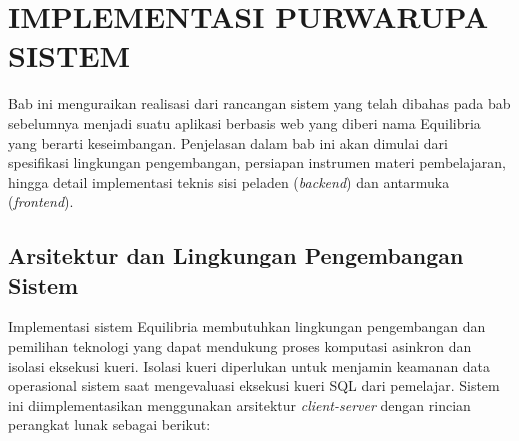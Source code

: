 \cleardoublepage
\chapter{IMPLEMENTASI PURWARUPA SISTEM}
\label{chap:implementasi}

Bab ini menguraikan realisasi dari rancangan sistem yang telah dibahas pada bab sebelumnya menjadi suatu aplikasi berbasis web yang diberi nama Equilibria yang berarti keseimbangan. Penjelasan dalam bab ini akan dimulai dari spesifikasi lingkungan pengembangan, persiapan instrumen materi pembelajaran, hingga detail implementasi teknis sisi peladen (\textit{backend}) dan antarmuka (\textit{frontend}).

\section{Arsitektur dan Lingkungan Pengembangan Sistem}
\label{sec:development_environment}

Implementasi sistem Equilibria membutuhkan lingkungan pengembangan dan pemilihan teknologi yang dapat mendukung proses komputasi asinkron dan isolasi eksekusi kueri. Isolasi kueri diperlukan untuk menjamin keamanan data operasional sistem saat mengevaluasi eksekusi kueri SQL dari pemelajar. Sistem ini diimplementasikan menggunakan arsitektur \textit{client-server} dengan rincian perangkat lunak sebagai berikut:

